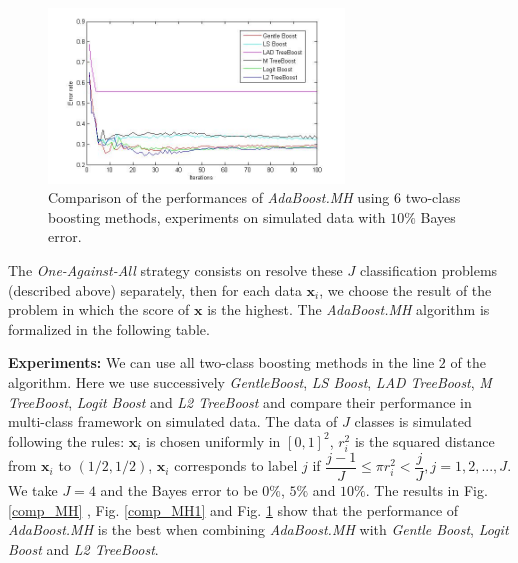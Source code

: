 \documentclass[a4paper,twoside,12pt]{article}
\begin{document}
\begin{figure}[ht]\centering
  	\includegraphics[width=0.7\textwidth]{comp_MH2.jpg}
  	\caption{Comparison of the performances of \textsl{AdaBoost.MH} using $6$ two-class boosting methods, experiments on simulated data with $10 \%$ Bayes error.}
  	\label{comp_MH2}
\end{figure}

The \textsl{One-Against-All} strategy consists on resolve these $J$ classification problems (described above) separately, then for each data $\textbf{x}_i$, we choose the result of the problem in which the score of $\textbf{x}$ is the highest. The \textsl{AdaBoost.MH} algorithm is formalized in the following table.

\begin{center}
\end{center}

\textbf{Experiments:} We can use all two-class boosting methods in the line $2$ of the algorithm. Here we use successively \textsl{GentleBoost}, \textsl{LS Boost}, \textsl{LAD TreeBoost}, \textsl{M TreeBoost}, \textsl{Logit Boost} and \textsl{L2 TreeBoost} and compare their performance in multi-class framework on simulated data. The data of $J$ classes is simulated following the rules: $\textbf{x}_i$ is chosen uniformly in $\left[ 0, 1\right]^2$, $r_i^2$ is the squared distance from $\textbf{x}_i$ to $(1/2, 1/2)$, $\textbf{x}_i$ corresponds to label $j$ if $\dfrac{j-1}{J} \leq \pi r_i^2 < \dfrac{j}{J}, j = 1,2,...,J$. We take $J = 4$ and the Bayes error to be $0 \%$, $5 \%$ and $10 \%$. The results in Fig. \ref{comp_MH} , Fig. \ref{comp_MH1} and Fig. \ref{comp_MH2} show that the performance of \textsl{AdaBoost.MH} is the best when combining \textsl{AdaBoost.MH} with \textsl{Gentle Boost}, \textsl{Logit Boost} and \textsl{L2 TreeBoost}.
\end{document}
